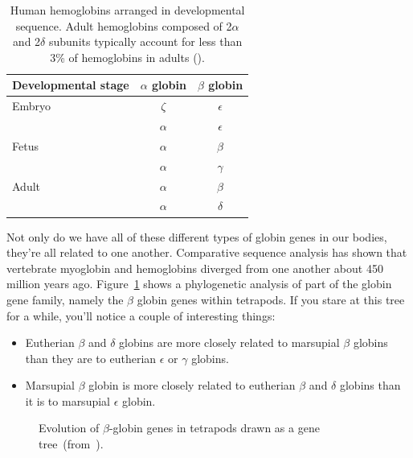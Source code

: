 \begin{table}
\begin{center}
\begin{tabular}{l|cc}
\hline\hline
Developmental stage & $\alpha$ globin & $\beta$ globin \\
\hline
Embryo & $\zeta$  & $\epsilon$ \\
       & $\alpha$ & $\epsilon$ \\
Fetus  & $\alpha$ & $\beta$ \\
       & $\alpha$  & $\gamma$ \\
Adult  & $\alpha$ & $\beta$ \\
       & $\alpha$ & $\delta$ \\
\hline
\end{tabular}
\end{center}
\caption{Human hemoglobins arranged in developmental sequence. Adult
  hemoglobins composed of 2$\alpha$ and 2$\delta$ subunits typically
  account for less than 3\% of hemoglobins in adults ().}\label{table:globins}
\end{table}

Not only do we have all of these different types of globin genes in
our bodies, they're all related to one another. Comparative sequence
analysis has shown that vertebrate myoglobin and hemoglobins diverged
from one another about 450 million years ago. Figure~\ref{fig:globins}
shows a phylogenetic analysis of part of the globin gene family,
namely the $\beta$ globin genes within tetrapods. If you stare at this
tree for a while, you'll notice a couple of interesting things:

\begin{itemize}

\item Eutherian $\beta$ and $\delta$ globins are more closely related
  to marsupial $\beta$ globins than they are to eutherian $\epsilon$
  or $\gamma$ globins.

\item Marsupial $\beta$ globin is more closely related to eutherian
  $\beta$ and $\delta$ globins than it is to marsupial $\epsilon$
  globin.

\end{itemize}

\begin{figure}
\begin{center}
\end{center}
\caption{Evolution of $\beta$-globin genes in tetrapods drawn as a
  gene tree~(from~\cite{Opazo-etal-2008}).}\label{fig:globins}
\end{figure}

